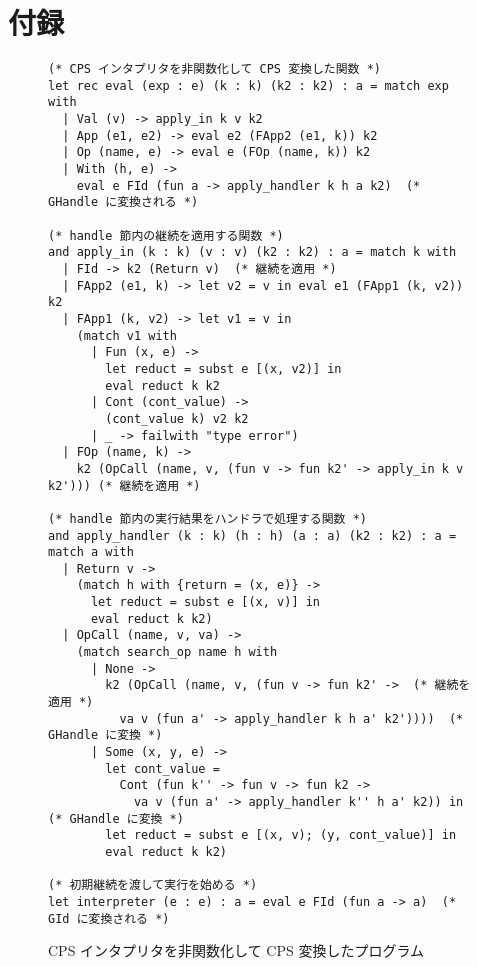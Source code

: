 \appendix
\section{付録}

\begin{figure}
\begin{spacing}{0.9} 
\begin{verbatim}
(* CPS インタプリタを非関数化して CPS 変換した関数 *)
let rec eval (exp : e) (k : k) (k2 : k2) : a = match exp with
  | Val (v) -> apply_in k v k2
  | App (e1, e2) -> eval e2 (FApp2 (e1, k)) k2
  | Op (name, e) -> eval e (FOp (name, k)) k2
  | With (h, e) ->
    eval e FId (fun a -> apply_handler k h a k2)  (* GHandle に変換される *)

(* handle 節内の継続を適用する関数 *)
and apply_in (k : k) (v : v) (k2 : k2) : a = match k with
  | FId -> k2 (Return v)  (* 継続を適用 *)
  | FApp2 (e1, k) -> let v2 = v in eval e1 (FApp1 (k, v2)) k2
  | FApp1 (k, v2) -> let v1 = v in
    (match v1 with
      | Fun (x, e) ->
        let reduct = subst e [(x, v2)] in
        eval reduct k k2
      | Cont (cont_value) ->
        (cont_value k) v2 k2
      | _ -> failwith "type error")
  | FOp (name, k) ->
    k2 (OpCall (name, v, (fun v -> fun k2' -> apply_in k v k2'))) (* 継続を適用 *)

(* handle 節内の実行結果をハンドラで処理する関数 *)
and apply_handler (k : k) (h : h) (a : a) (k2 : k2) : a = match a with
  | Return v ->
    (match h with {return = (x, e)} ->
      let reduct = subst e [(x, v)] in
      eval reduct k k2)
  | OpCall (name, v, va) ->
    (match search_op name h with
      | None ->
        k2 (OpCall (name, v, (fun v -> fun k2' ->  (* 継続を適用 *)
          va v (fun a' -> apply_handler k h a' k2'))))  (* GHandle に変換 *)
      | Some (x, y, e) ->
        let cont_value =
          Cont (fun k'' -> fun v -> fun k2 ->
            va v (fun a' -> apply_handler k'' h a' k2)) in  (* GHandle に変換 *)
        let reduct = subst e [(x, v); (y, cont_value)] in
        eval reduct k k2)

(* 初期継続を渡して実行を始める *)
let interpreter (e : e) : a = eval e FId (fun a -> a)  (* GId に変換される *)
\end{verbatim}
\caption{CPS インタプリタを非関数化して CPS 変換したプログラム}
\label{figure:3cps}
\end{spacing}
\end{figure}

